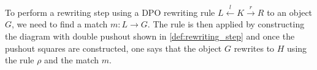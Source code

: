 To perform a rewriting step using a DPO rewriting rule $L \overset{l}{\leftarrow} K \overset{r}{\rightarrow} R$ to an object $G$, we need to find a match $m:L \to G$. The rule is then applied by constructing the diagram with double pushout shown in \autoref{def:rewriting_step} and once the pushout squares are constructed, one says that the object $G$ rewrites to $H$ using the rule $\rho$ and the match $m$. 


